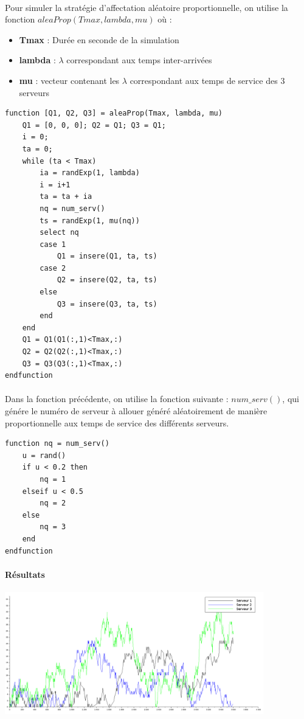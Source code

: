 \documentclass{article}
\begin{document}
\paragraph{}
Pour simuler la stratégie d'affectation aléatoire proportionnelle, on utilise la fonction $aleaProp(Tmax,lambda,mu)$ où :
\begin{itemize}
	\item \textbf{Tmax} : Durée en seconde de la simulation
	\item \textbf{lambda} : $\lambda$ correspondant aux temps inter-arrivées
	\item \textbf{mu} : vecteur contenant les $\lambda$ correspondant aux temps de service des 3 serveurs
\end{itemize}
\begin{verbatim}
function [Q1, Q2, Q3] = aleaProp(Tmax, lambda, mu)
    Q1 = [0, 0, 0]; Q2 = Q1; Q3 = Q1;
    i = 0;
    ta = 0;
    while (ta < Tmax)
        ia = randExp(1, lambda)
        i = i+1
        ta = ta + ia 
        nq = num_serv() 
        ts = randExp(1, mu(nq))
        select nq
        case 1
            Q1 = insere(Q1, ta, ts)
        case 2 
            Q2 = insere(Q2, ta, ts)
        else
            Q3 = insere(Q3, ta, ts)
        end
    end
    Q1 = Q1(Q1(:,1)<Tmax,:)
    Q2 = Q2(Q2(:,1)<Tmax,:) 
    Q3 = Q3(Q3(:,1)<Tmax,:) 
endfunction 
\end{verbatim}

\paragraph{}
Dans la fonction précédente, on utilise la fonction suivante : $num\_serv()$, qui génére le numéro de serveur à allouer généré aléatoirement de manière proportionnelle aux temps de service des différents serveurs.

\begin{verbatim}
function nq = num_serv()
    u = rand()
    if u < 0.2 then
        nq = 1
    elseif u < 0.5
        nq = 2
    else
        nq = 3
    end
endfunction
\end{verbatim}

\paragraph{Résultats}
\begin{center}
	\includegraphics[width=425px]{img/aleaProp.png}
\end{center}
\end{document}

